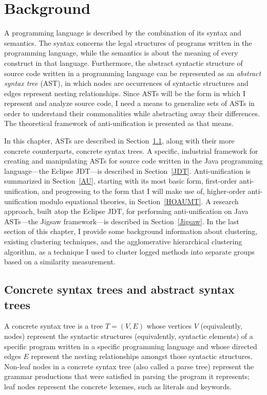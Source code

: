 \chapter{Background}  \label{background}
A programming language is described by the combination of its syntax and semantics. The syntax concerns the legal structures of programs written in the programming language, while the semantics is about the meaning of every construct in that language. Furthermore, the abstract syntactic structure of source code written in a programming language can be represented as an \emph{abstract syntax tree} (AST), in which nodes are occurrences of syntactic structures and edges represent nesting relationships. Since ASTs will be the form in which I represent and analyze source code, I need a means to generalize sets of ASTs in order to understand their commonalities while abstracting away their differences. The theoretical framework of anti-unification is presented as that means.

In this chapter, ASTs are described in Section~\ref{AST}, along with their more concrete counterparts, concrete syntax trees. A specific, industrial framework for creating and manipulating ASTs for source code written in the Java programming language---the Eclipse JDT---is described in Section~\ref{JDT}.  Anti-unification is summarized in Section~\ref{AU}, starting with its most basic form, first-order anti-unification, and progressing to the form that I will make use of, higher-order anti-unification modulo equational theories, in Section~\ref{HOAUMT}.  A research approach, built atop the Eclipse JDT, for performing anti-unification on Java ASTs---the Jigsaw framework---is described in Section~\ref{Jigsaw}. In the last section of this chapter, I provide some background information about clustering, existing clustering techniques, and the agglomerative hierarchical clustering algorithm, as a technique I used to cluster logged methods into separate groups based on a similarity measurement.

\section{Concrete syntax trees and abstract syntax trees}\label{AST}

A concrete syntax tree is a tree $T=(V,E)$ whose vertices $V$ (equivalently, nodes) represent the syntactic structures (equivalently, syntactic elements) of a specific program written in a specific programming language and whose directed edges $E$ represent the nesting relationships amongst those syntactic structures.  Non-leaf nodes in a concrete syntax tree (also called a parse tree) represent the grammar productions that were satisfied in parsing the program it represents; leaf nodes represent the concrete lexemes, such as literals and keywords.

